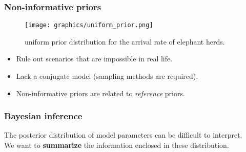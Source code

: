 \documentclass{beamer}
\newcommand{\1}{\ensuremath{\mathbf{1}}}
\begin{document}
%
%
%
\begin{frame}\frametitle{Non-informative priors}
	\begin{figure}
	\begin{center}
		\texttt{[image: graphics/uniform\_prior.png]}
	\end{center}
	\caption{uniform prior distribution for the arrival rate of elephant herds.}
	\end{figure}
	\begin{itemize}
		\item Rule out scenarios that are impossible in real life.
		\item Lack a conjugate model (sampling methods are required).
		\item Non-informative priors are related to \emph{reference} priors.
	\end{itemize}
\end{frame}
%
%
%
%
%
%
\begin{frame}\frametitle{Bayesian inference}
	The posterior distribution of model parameters can be difficult to interpret.\\[2ex]
	We want to \textbf{summarize} the information enclosed in these distribution.
\end{frame}
\end{document}
